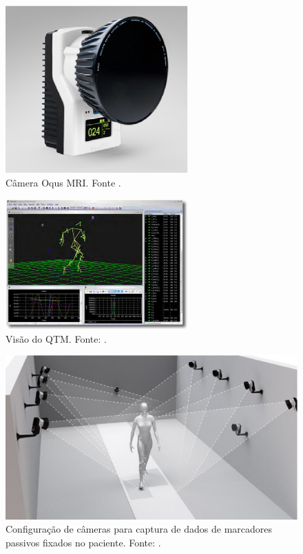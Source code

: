 \begin{figure}[ht]
	\centering
	\includegraphics[width=7cm]{figuras/oqus-mri.eps}
	\caption{Câmera Oqus MRI. Fonte \cite{Qualisys2013}.
}
	\label{oqus_mri}
\end{figure}


\begin{figure}[ht]
	\centering
	\includegraphics[width=7cm]{figuras/qtm.eps}
	\caption{Visão do QTM. Fonte: \cite{Qualisys2010}.}
	\label{visao_qtm}
	
\end{figure}


\begin{figure}[ht]
	\centering
	\includegraphics[width=14cm]{figuras/markers.eps}
	\caption{Configuração de câmeras para captura de dados de marcadores passivos fixados no paciente. Fonte: \cite{Qualisys2013a}.}
	\label{markers}
	
\end{figure}





